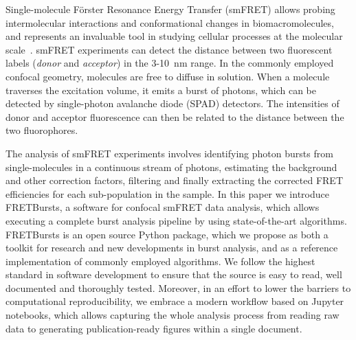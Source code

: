 Single-molecule Förster Resonance Energy Transfer (smFRET) allows probing intermolecular interactions
and conformational changes in biomacromolecules, and represents an 
invaluable tool in studying cellular processes at the molecular 
scale~\cite{Kapanidis_2006}. smFRET experiments can detect the distance between 
two fluorescent labels (\textit{donor} and \textit{acceptor}) in the 
3-10~nm range. In the commonly employed confocal geometry, molecules are free 
to diffuse in solution. When a molecule traverses the excitation volume, it 
emits a burst of photons, which can be detected by single-photon avalanche diode (SPAD) detectors. 
The intensities of donor and acceptor fluorescence 
can then be related to the distance between the two fluorophores.

The analysis of smFRET experiments involves identifying photon bursts from 
single-molecules in a continuous stream of photons, estimating the 
background and other correction factors, filtering and finally extracting the corrected 
FRET efficiencies for each sub-population in the sample. In this paper we introduce FRETBursts,
a software for confocal smFRET data analysis, which 
allows executing a complete burst analysis pipeline by using state-of-the-art algorithms.
FRETBursts is an open source Python package, which we propose as both a toolkit 
for research and new developments in burst analysis, and as a reference implementation of commonly employed algorithms.
We follow the highest standard in software development to ensure that 
the source is easy to read, well documented and thoroughly tested. 
Moreover, in an effort to lower the barriers to computational reproducibility, 
we embrace a modern workflow based on Jupyter notebooks, which allows capturing the whole analysis process from reading raw data to generating publication-ready figures within a single document.
